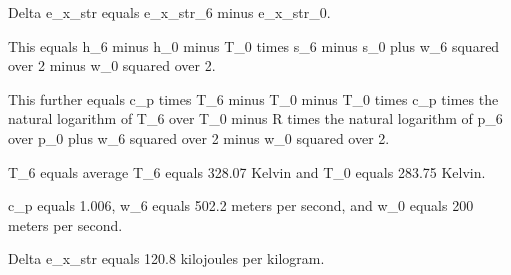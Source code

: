 Delta e_x_str equals e_x_str_6 minus e_x_str_0.

This equals h_6 minus h_0 minus T_0 times s_6 minus s_0 plus w_6 squared over 2 minus w_0 squared over 2.

This further equals c_p times T_6 minus T_0 minus T_0 times c_p times the natural logarithm of T_6 over T_0 minus R times the natural logarithm of p_6 over p_0 plus w_6 squared over 2 minus w_0 squared over 2.

T_6 equals average T_6 equals 328.07 Kelvin and T_0 equals 283.75 Kelvin.

c_p equals 1.006, w_6 equals 502.2 meters per second, and w_0 equals 200 meters per second.

Delta e_x_str equals 120.8 kilojoules per kilogram.